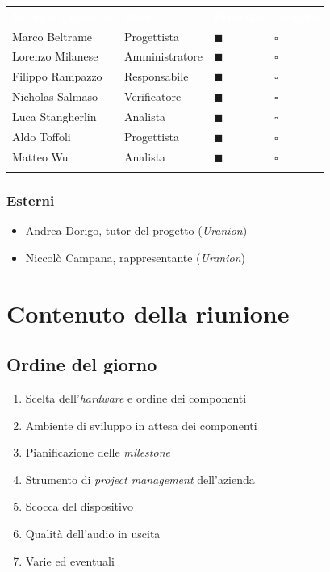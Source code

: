 \documentclass[12pt,a4paper]{article}
\newcommand{\tightlist}{\setlength{\itemsep}{1pt}\setlength{\parskip}{0pt}}
\begin{document}
\begin{center}
\begin{tabularx}{\linewidth}{>{\raggedright\arraybackslash}X>{\raggedright\arraybackslash}p{4cm}>{\centering\arraybackslash}p{2cm}>{\centering\arraybackslash}p{2cm}}
\rowcolor{bfblue}\textcolor{white}{\textbf{Nome e Cognome}} & \textcolor{white}{\textbf{Ruolo}} & \textcolor{white}{\textbf{Presente}} & \textcolor{white}{\textbf{Assente}} \\
Marco Beltrame & Progettista & $\blacksquare$ & $\square$ \\ \arrayrulecolor{bfline}\hline
Lorenzo Milanese & Amministratore & $\blacksquare$ & $\square$ \\ \arrayrulecolor{bfline}\hline
Filippo Rampazzo & Responsabile & $\blacksquare$ & $\square$ \\ \arrayrulecolor{bfline}\hline
Nicholas Salmaso & Verificatore & $\blacksquare$ & $\square$ \\ \arrayrulecolor{bfline}\hline
Luca Stangherlin & Analista & $\blacksquare$ & $\square$ \\ \arrayrulecolor{bfline}\hline
Aldo Toffoli & Progettista & $\blacksquare$ & $\square$ \\ \arrayrulecolor{bfline}\hline
Matteo Wu & Analista & $\blacksquare$ & $\square$ \\ \arrayrulecolor{bfline}\hline
\end{tabularx}
\end{center}

\subsubsection{Esterni}

\begin{itemize}
\tightlist
\item Andrea Dorigo, tutor del progetto (\emph{Uranion})
\item Niccolò Campana, rappresentante (\emph{Uranion})
\end{itemize}

\break
\section{Contenuto della riunione}

\subsection{Ordine del giorno}

\begin{enumerate}
\def\labelenumi{\arabic{enumi}.}
\tightlist
\item Scelta dell'\emph{hardware} e ordine dei componenti
\item Ambiente di sviluppo in attesa dei componenti
\item Pianificazione delle \emph{milestone}
\item Strumento di \emph{project management} dell'azienda
\item Scocca del dispositivo
\item Qualità dell'audio in uscita
\item Varie ed eventuali
\end{enumerate}
\end{document}
